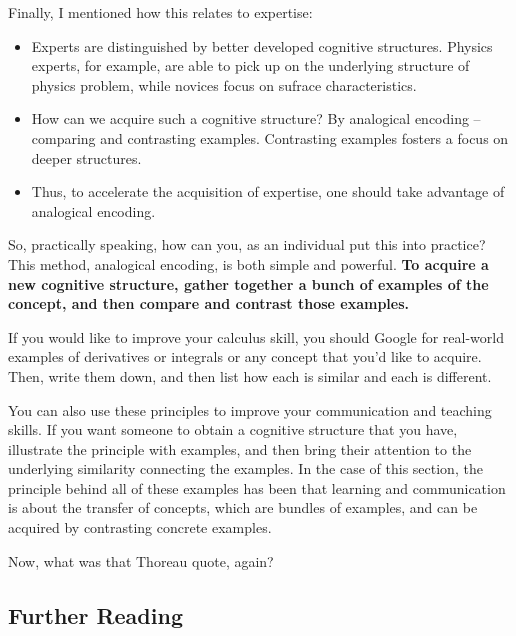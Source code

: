 Finally, I mentioned how this relates to expertise:

\begin{itemize}
\itemsep1pt\parskip0pt
\item
  Experts are distinguished by better developed cognitive structures.
  Physics experts, for example, are able to pick up on the underlying
  structure of physics problem, while novices focus on sufrace
  characteristics.
\item
  How can we acquire such a cognitive structure? By analogical encoding
  -- comparing and contrasting examples. Contrasting examples fosters a
  focus on deeper structures.
\item
  Thus, to accelerate the acquisition of expertise, one should take
  advantage of analogical encoding.
\end{itemize}

So, practically speaking, how can you, as an individual put this into
practice? This method, analogical encoding, is both simple and powerful.
\textbf{To acquire a new cognitive structure, gather together a bunch of
examples of the concept, and then compare and contrast those examples.}

If you would like to improve your calculus skill, you should Google for
real-world examples of derivatives or integrals or any concept that
you'd like to acquire. Then, write them down, and then list how each is
similar and each is different.

You can also use these principles to improve your communication and
teaching skills. If you want someone to obtain a cognitive structure
that you have, illustrate the principle with examples, and then bring
their attention to the underlying similarity connecting the examples. In
the case of this section, the principle behind all of these examples has
been that learning and communication is about the transfer of concepts,
which are bundles of examples, and can be acquired by contrasting
concrete examples.

Now, what was that Thoreau quote, again?

\subsection{Further Reading}\label{further-reading}

